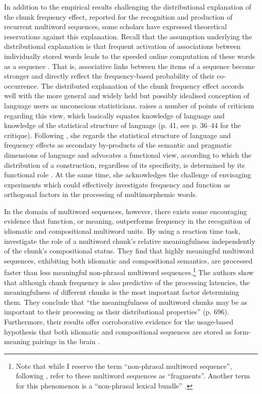 In addition to the empirical results challenging the distributional explanation of the chunk frequency effect, reported for the recognition and production of recurrent multiword sequences, some scholars have expressed theoretical reservations against this explanation. Recall that the assumption underlying the distributional explanation is that frequent activation of associations between individually stored words leads to the speeded online computation of these words as a sequence \citep[cf.][]{jurafsky-etal2001,mcdonald-shillcock}. That is, associative links between the items of a sequence become stronger and directly reflect the frequency-based probability of their co-occurrence. The distributed explanation of the chunk frequency effect accords well with the more general and widely held but possibly idealised conception of   language users as unconscious statisticians. \citet{blumenthal} raises a number of points of criticism regarding this view, which basically equates knowledge of language and knowledge of the statistical structure of language (p. 41, see p. 36--44 for the critique). Following \citet{bley-vroman}, she regards the statistical structure of language and frequency effects as secondary by-products of the semantic and pragmatic dimensions of language and advocates a functional view, according to which the distribution of a construction, regardless of its specificity, is determined by its functional role \citep[cf.][]{goldberg-2006}. At the same time, she acknowledges the challenge of envisaging experiments which could effectively investigate frequency and function as orthogonal factors in the processing of multimorphemic words. 

In the domain of multiword sequences, however, there exists some encouraging evidence that function, or meaning, outperforms frequency in the recognition of idiomatic and compositional multiword units. By using a reaction time task, \citet{jolsvai-etal} investigate the role of a multiword chunk's relative meaningfulness independently of the chunk's compositional status. They find that highly meaningful multiword sequences, exhibiting both idiomatic and compositional semantics, are processed faster than less meaningful non-phrasal multiword sequences.\footnote{Note that while I reserve the term ``non-phrasal multiword sequence'', following \citet[]{tremblay-baayen}, \citeauthor{jolsvai-etal} refer to these multiword sequences as ``fragments''. Another term for this phenomenon is a ``non-phrasal lexical bundle'' \citep{biber-etal-1999,tremblay-etal11}.} The authors show that although chunk frequency is also predictive of the processing latencies, the meaningfulness of different chunks is the most important factor determining them. They conclude that ``the meaningfulness of multiword chunks may be as important to their processing as their distributional properties'' (p. 696). Furthermore,  their results offer corroborative evidence for the usage-based hypothesis that both idiomatic and compositional sequences are stored as form-meaning pairings in the brain \citep{bybee-book-2010,goldberg-2003,goldberg-2006}. 


